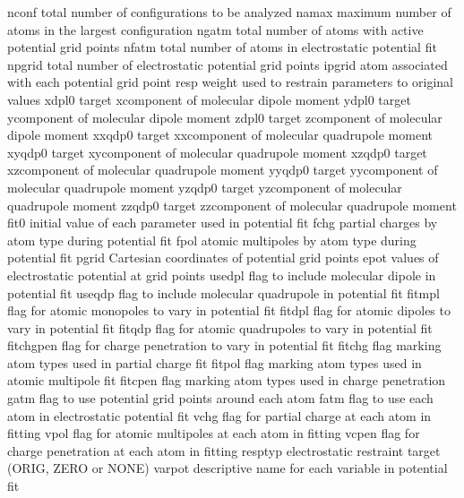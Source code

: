 \documentclass[letterpaper,11pt,english]{sphinxmanual}
\begin{document}
\sphinxAtStartPar
{}

\begin{sphinxVerbatim}[commandchars=\\\{\}]
nconf           total number of configurations to be analyzed
namax           maximum number of atoms in the largest configuration
ngatm           total number of atoms with active potential grid points
nfatm           total number of atoms in electrostatic potential fit
npgrid          total number of electrostatic potential grid points
ipgrid          atom associated with each potential grid point
resp            weight used to restrain parameters to original values
xdpl0           target x\PYGZhy{}component of molecular dipole moment
ydpl0           target y\PYGZhy{}component of molecular dipole moment
zdpl0           target z\PYGZhy{}component of molecular dipole moment
xxqdp0          target xx\PYGZhy{}component of molecular quadrupole moment
xyqdp0          target xy\PYGZhy{}component of molecular quadrupole moment
xzqdp0          target xz\PYGZhy{}component of molecular quadrupole moment
yyqdp0          target yy\PYGZhy{}component of molecular quadrupole moment
yzqdp0          target yz\PYGZhy{}component of molecular quadrupole moment
zzqdp0          target zz\PYGZhy{}component of molecular quadrupole moment
fit0            initial value of each parameter used in potential fit
fchg            partial charges by atom type during potential fit
fpol            atomic multipoles by atom type during potential fit
pgrid           Cartesian coordinates of potential grid points
epot            values of electrostatic potential at grid points
use\PYGZus{}dpl         flag to include molecular dipole in potential fit
use\PYGZus{}qdp         flag to include molecular quadrupole in potential fit
fit\PYGZus{}mpl         flag for atomic monopoles to vary in potential fit
fit\PYGZus{}dpl         flag for atomic dipoles to vary in potential fit
fit\PYGZus{}qdp         flag for atomic quadrupoles to vary in potential fit
fit\PYGZus{}chgpen      flag for charge penetration to vary in potential fit
fitchg          flag marking atom types used in partial charge fit
fitpol          flag marking atom types used in atomic multipole fit
fitcpen         flag marking atom types used in charge penetration
gatm            flag to use potential grid points around each atom
fatm            flag to use each atom in electrostatic potential fit
vchg            flag for partial charge at each atom in fitting
vpol            flag for atomic multipoles at each atom in fitting
vcpen           flag for charge penetration at each atom in fitting
resptyp         electrostatic restraint target (ORIG, ZERO or NONE)
varpot          descriptive name for each variable in potential fit
\end{sphinxVerbatim}
\end{document}
